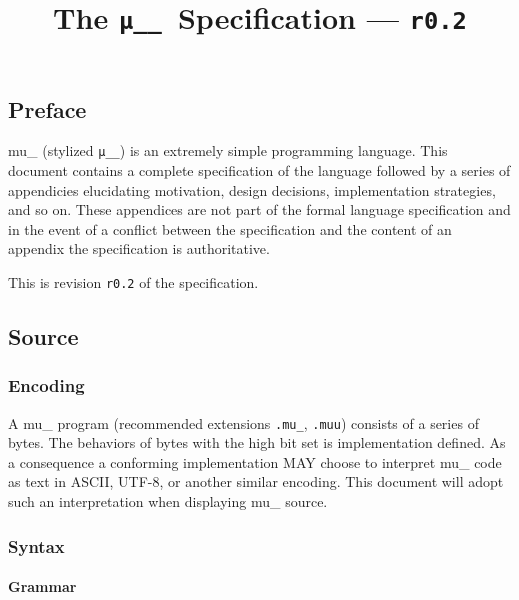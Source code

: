\documentclass[twocolumn]{report}
\newcommand\muu{\texttt{μ\!\!\!\_\_}}
\newcommand\rev{\texttt{r0.2} }
\begin{document}
\title{The \muu\ Specification --- \rev}

\makeatletter\chapter*{\@title}\makeatother
\label{ch:main}

\section*{Preface}
\label{sec:preface}

mu\_ (stylized \muu) is an extremely simple programming language.
This document contains a complete specification of the language followed by a series of appendicies elucidating motivation, design decisions, implementation strategies, and so on.
These appendices are not part of the formal language specification and in the event of a conflict between the specification and the content of an appendix the specification is authoritative.

This is revision \rev of the specification.

\section{Source}
\label{sec:source}

\subsection{Encoding}
\label{subsec:encoding}

A mu\_ program (recommended extensions \texttt{.mu\_}, \texttt{.muu}) consists of a series of bytes.
The behaviors of bytes with the high bit set is implementation defined.
As a consequence a conforming implementation MAY choose to interpret mu\_ code as text in ASCII, UTF-8, or another similar encoding.
This document will adopt such an interpretation when displaying mu\_ source.

\subsection{Syntax}
\label{subsec:syntax}

\subsubsection{Grammar}
\label{subsubsec:grammar}
\end{document}
